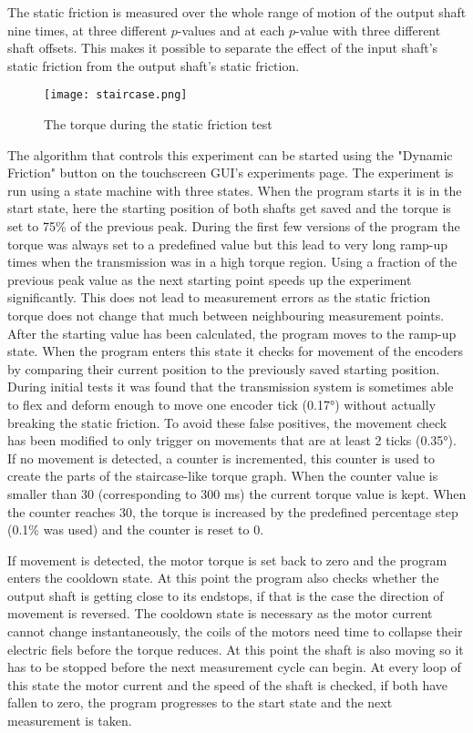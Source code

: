 \documentclass[12pt]{article}
\begin{document}
The static friction is measured over the whole range of motion of the output shaft nine times, at three different $p$-values and at each $p$-value with three different shaft offsets. This makes it possible to separate the effect of the input shaft's static friction from the output shaft's static friction.

\begin{figure}[h]
    \centering
    \texttt{[image: staircase.png]}
    \caption{The torque during the static friction test}
    \label{fig:staticFricTorqueTime}
\end{figure}

The algorithm that controls this experiment can be started using the "Dynamic Friction" button on the touchscreen GUI's experiments page. The experiment is run using a state machine with three states. When the program starts it is in the start state, here the starting position of both shafts get saved and the torque is set to 75\% of the previous peak. During the first few versions of the program the torque was always set to a predefined value but this lead to very long ramp-up times when the transmission was in a high torque region. Using a fraction of the previous peak value as the next starting point speeds up the experiment significantly. This does not lead to measurement errors as the static friction torque does not change that much between neighbouring measurement points. \\

After the starting value has been calculated, the program moves to the ramp-up state. When the program enters this state it checks for movement of the encoders by comparing their current position to the previously saved starting position. During initial tests it was found that the transmission system is sometimes able to flex and deform enough to move one encoder tick (0.17°) without actually breaking the static friction. To avoid these false positives, the movement check has been modified to only trigger on movements that are at least 2 ticks (0.35°). \\

If no movement is detected, a counter is incremented, this counter is used to create the parts of the staircase-like torque graph. When the counter value is smaller than 30 (corresponding to 300 ms) the current torque value is kept. When the counter reaches 30, the torque is increased by the predefined percentage step (0.1\% was used) and the counter is reset to 0.

If movement is detected, the motor torque is set back to zero and the program enters the cooldown state. At this point the program also checks whether the output shaft is getting close to its endstops, if that is the case the direction of movement is reversed.
The cooldown state is necessary as the motor current cannot change instantaneously, the coils of the motors need time to collapse their electric fiels before the torque reduces. At this point the shaft is also moving so it has to be stopped before the next measurement cycle can begin. At every loop of this state the motor current and the speed of the shaft is checked, if both have fallen to zero, the program progresses to the start state and the next measurement is taken.
\end{document}
